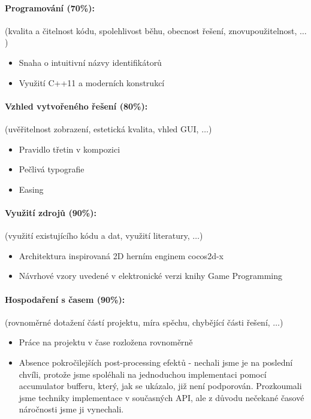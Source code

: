 \documentclass[12pt,a4paper,titlepage,final]{report}
\begin{document}
\paragraph{Programování (70\%):} (kvalita a čitelnost kódu, spolehlivost běhu,
obecnost řešení, znovupoužitelnost, $\ldots$)

  \begin{itemize}
  \item Snaha o intuitivní názvy identifikátorů
  \item Využití C++11 a moderních konstrukcí
  \end{itemize}

\paragraph{Vzhled vytvořeného řešení (80\%):} (uvěřitelnost zobrazení,
estetická kvalita, vhled GUI, $\ldots$)

  \begin{itemize}
  \item Pravidlo třetin v kompozici
  \item Pečlivá typografie
  \item Easing
  \end{itemize}

\paragraph{Využití zdrojů (90\%):} (využití existujícího kódu a dat, využití
literatury, $\ldots$)

  \begin{itemize}
  \item Architektura inspirovaná 2D herním enginem cocos2d-x
  \item Návrhové vzory uvedené v elektronické verzi knihy Game Programming
  \end{itemize}

\paragraph{Hospodaření s časem (90\%):} (rovnoměrné dotažení částí projektu,
míra spěchu, chybějící části řešení, $\ldots$)

  \begin{itemize}
  \item Práce na projektu v čase rozložena rovnoměrně
  \item Absence pokročilejších post-processing efektů - nechali jsme je na poslední chvíli, protože jsme spoléhali na jednoduchou implementaci pomocí accumulator bufferu, který, jak se ukázalo, již není podporován. Prozkoumali jsme techniky implementace v současných API, ale z důvodu nečekané časové náročnosti jsme ji vynechali.
  \end{itemize}
\end{document}
